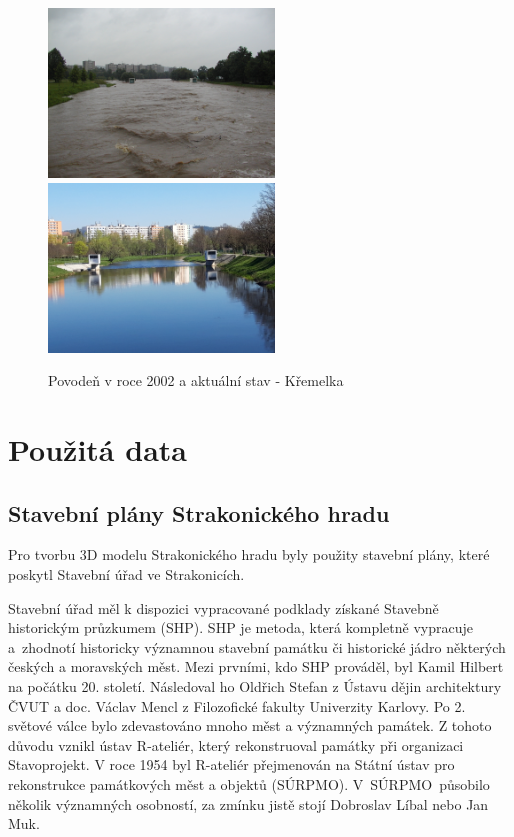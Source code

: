 \documentclass[thesis=M,czech]{FITthesis}[2012/06/26]
\begin{document}
\begin{figure}[h!]
\centering
\includegraphics[width=6cm]{pics/povoden4.jpg}
\includegraphics[width=6cm]{pics/povoden4_2019.jpg}
\caption{Povodeň v roce 2002 a aktuální stav - Křemelka}
\label{obr:povoden_hrad}
\end{figure}

\chapter{Použitá data}
\section{Stavební plány Strakonického hradu}
Pro tvorbu 3D modelu Strakonického hradu byly použity stavební plány, které poskytl Stavební úřad ve Strakonicích. 

Stavební úřad měl k dispozici vypracované podklady získané Stavebně historickým průzkumem (SHP). SHP je metoda, která kompletně vypracuje a~zhodnotí historicky významnou stavební památku či historické jádro některých českých a moravských měst. Mezi prvními, kdo SHP prováděl, byl Kamil Hilbert na počátku 20. století. Následoval ho Oldřich Stefan z Ústavu dějin architektury ČVUT a doc. Václav Mencl z Filozofické fakulty Univerzity Karlovy. Po 2. světové válce bylo zdevastováno mnoho měst a významných památek. Z tohoto důvodu vznikl ústav R-ateliér, který rekonstruoval památky při organizaci Stavoprojekt. V roce 1954 byl R-ateliér přejmenován na Státní ústav pro rekonstrukce památkových měst a objektů (SÚRPMO). V~\mbox{SÚRPMO}~působilo několik významných osobností, za zmínku jistě stojí Dobroslav Líbal nebo Jan Muk. 
\end{document}
